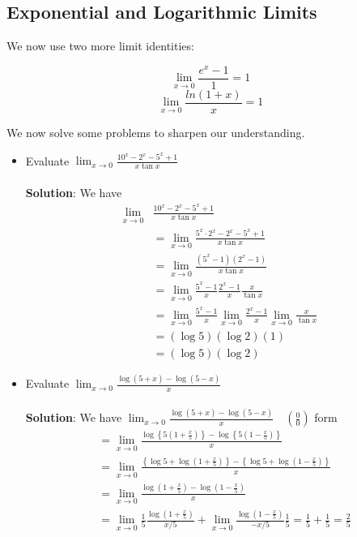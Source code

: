 \subsection{Exponential and Logarithmic Limits}

We now use two more limit identities:

\begin{outline}
    $$\lim_{x \to 0}\frac{e^x-1}{1}=1$$
    $$\lim_{x \to 0}\frac{ln(1+x)}{x}=1$$
\end{outline}

We now solve some problems to sharpen our understanding.

\begin{itemize}
    \item Evaluate $\lim _{x \rightarrow 0} \frac{10^x-2^x-5^x+1}{x \tan x}$\\\\
\textbf{Solution}:
We have
$$
\begin{aligned}
\lim _{x \rightarrow 0} & \frac{10^x-2^x-5^x+1}{x \tan x} \\
& =\lim _{x \rightarrow 0} \frac{5^x \cdot 2^x-2^x-5^x+1}{x \tan x} \\
& =\lim _{x \rightarrow 0} \frac{\left(5^x-1\right)\left(2^x-1\right)}{x \tan x} \\
& =\lim _{x \rightarrow 0} \frac{5^x-1}{x} \frac{2^x-1}{x} \frac{x}{\tan x} \\
& =\lim _{x \rightarrow 0} \frac{5^x-1}{x} \lim _{x \rightarrow 0} \frac{2^x-1}{x} \lim _{x \rightarrow 0} \frac{x}{\tan x} \\
& =(\log 5)(\log 2)(1) \\
& =(\log 5)(\log 2)
\end{aligned}
$$


\item  Evaluate $\lim _{x \rightarrow 0} \frac{\log (5+x)-\log (5-x)}{x}$\\\\
\textbf{Solution}: We have $\lim _{x \rightarrow 0} \frac{\log (5+x)-\log (5-x)}{x} \quad\left(\frac{0}{0}\right)$ form
$$
\begin{aligned}
& =\lim _{x \rightarrow 0} \frac{\log \left\{5\left(1+\frac{x}{5}\right)\right\}-\log \left\{5\left(1-\frac{x}{5}\right)\right\}}{x} \\
& =\lim _{x \rightarrow 0} \frac{\left\{\log 5+\log \left(1+\frac{x}{5}\right)\right\}-\left\{\log 5+\log \left(1-\frac{x}{5}\right)\right\}}{x} \\
& =\lim _{x \rightarrow 0} \frac{\log \left(1+\frac{x}{5}\right)-\log \left(1-\frac{x}{5}\right)}{x} \\
& =\lim _{x \rightarrow 0} \frac{1}{5} \frac{\log \left(1+\frac{x}{5}\right)}{x / 5}+\lim _{x \rightarrow 0} \frac{\log \left(1-\frac{x}{5}\right)}{-x / 5} \frac{1}{5}=\frac{1}{5}+\frac{1}{5}=\frac{2}{5}
\end{aligned}
$$
\end{itemize}


